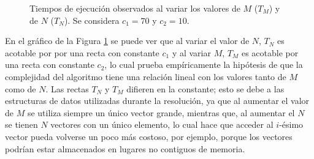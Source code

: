     \begin{figure}[H]
        \centering
        \caption{Tiempos de ejecución observados al variar los valores de $M$
        ($T_M$) y de $N$ ($T_N$). Se considera $c_1 = 70$ y $c_2 = 10$.}
        \label{fig:exp3:var-nym-base}
    \end{figure}

	En el gráfico de la Figura \ref{fig:exp3:var-nym-base} se puede ver que al 
	variar el valor de $N$, $T_N$  es acotable por por una recta con constante 
	$c_1$ y al variar $M$, $T_M$ es acotable por una recta con constante $c_2$, lo 
	cual prueba empíricamente la hipótesis de que la complejidad del algoritmo 
	tiene una relación lineal con los valores tanto de $M$ como de $N$. 
	Las rectas $T_N$ y $T_M$ difieren en la constante; esto se
	debe a las estructuras de datos utilizadas durante la resolución, ya que al
	aumentar el valor de $M$ se utiliza siempre un único vector grande, mientras
	que, al aumentar el $N$ se tienen $N$ vectores con un único elemento, lo
	cual hace que acceder al $i$-ésimo vector pueda volverse un poco más
	costoso, por ejemplo, porque los vectores podrían estar almacenados en
	lugares no contiguos de memoria.

